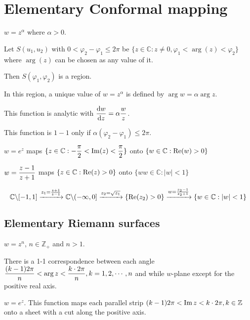 \section{Elementary Conformal mapping}
\begin{example}
    $ w=z^\alpha $ where  $ \alpha>0 $.
    
    Let  $ S(u_1,u_2) $ with  $ 0<\varphi_2-\varphi_1 \leq 2\pi $ be  $ \{z\in \mathbb{C}:z\not=0,\varphi_1<\arg(z)<\varphi_2\} $ where  $ \arg(z) $ can be chosen as any value of it.   

    Then  $ S(\varphi_1,\varphi_2) $ is a region.
    
    In this region, a unique value of  $ w=z^\alpha $ is defined by  $ \arg w=\alpha\arg z $.
    
    This function is analytic with  $ \displaystyle\frac{\mathrm{d}w}{\mathrm{d}z}=\alpha\displaystyle\frac{w}{z} $.
    
    This function is  $ 1-1 $ only if  $ \alpha(\varphi_2-\varphi_1) \leq 2\pi $.  
\end{example}
\begin{example}
    $ w=e^z  $  maps  $ \{z\in \mathbb{C}:\displaystyle-\frac{\pi }{2}<\operatorname{Im}(z)<\frac{\pi}{2}\} $ onto  $ \{w\in\mathbb{C}:\mathrm{Re}( w)>0\} $ 
\end{example}
\begin{example}
    $ w=\displaystyle\frac{z-1}{z+1} $ maps  $ \{z\in \mathbb{C}:\mathrm{Re}(z)>0\} $ onto  $ \{ww\in \mathbb{C}:|w|<1\} $   
\end{example}
\begin{example}
    \begin{equation}
        \mathbb{C}\backslash[-1,1]\xrightarrow{z_1=\frac{z+1}{z-1}}\mathbb{C}\backslash(-\infty,0]\xrightarrow{z_2=\sqrt{z_1}}\{\mathrm{Re}(z_2)>0\}\xrightarrow{w=\frac{z_2-1}{z_2+1}}\{w\in\mathbb{C}:|w|<1\}
    \end{equation}
\end{example}
\subsection{Elementary Riemann surfaces}
\begin{example}
    $ w=z^n $,  $ n\in \mathbb{Z}_+ $ and  $ n>1 $.
    
    There is a 1-1 correspondence between each angle  $ \displaystyle\frac{(k-1)2\pi}{n}<\arg z<\frac{k\cdot 2\pi}{n},k=1,2,\cdots,n $ and while  $ w $-plane except for the positive real axis.  
\end{example}
\begin{example}
    $ w=e^z $. This function maps each parallel strip $ (k-1)2\pi<\operatorname{Im} z<k\cdot 2\pi, k\in \mathbb{Z} $ onto a sheet with a  cut along the positive axis.
\end{example}
